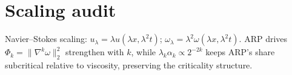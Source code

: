 \section{Scaling audit}
Navier--Stokes scaling: $u_\lambda=\lambda u(\lambda x,\lambda^2 t)$; $\omega_\lambda=\lambda^2\omega(\lambda x,\lambda^2 t)$.
ARP drives $\Phi_k=\|\nabla^k\omega\|_2^2$ strengthen with $k$, while $\lambda_k\alpha_k\propto 2^{-2k}$ keeps ARP's share subcritical relative to viscosity, preserving the criticality structure.
